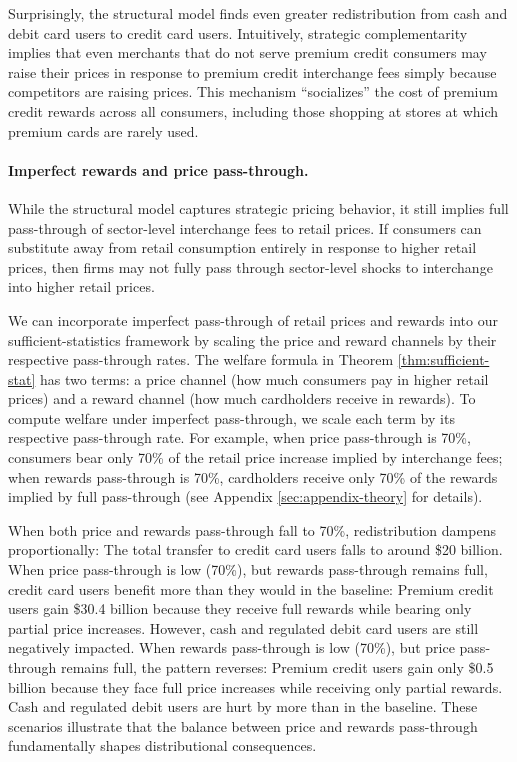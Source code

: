 \documentclass[11pt,english]{article}
\theoremstyle{remark}
\begin{document}
Surprisingly, the structural model finds even greater redistribution from cash and debit card users to credit card users.
Intuitively, strategic complementarity implies that even merchants that do not serve premium credit consumers may raise their prices in response to premium credit interchange fees simply because competitors are raising prices.
This mechanism ``socializes'' the cost of premium credit rewards across all consumers, including those shopping at stores at which premium cards are rarely used.

\paragraph{Imperfect rewards and price pass-through.}
While the structural model captures strategic pricing behavior, it still implies full pass-through of sector-level interchange fees to retail prices.
If consumers can substitute away from retail consumption entirely in response to higher retail prices, then firms may not fully pass through sector-level shocks to interchange into higher retail prices.

We can incorporate imperfect pass-through of retail prices and rewards into our sufficient-statistics framework by scaling the price and reward channels by their respective pass-through rates.
The welfare formula in Theorem \ref{thm:sufficient-stat} has two terms: a price channel (how much consumers pay in higher retail prices) and a reward channel (how much cardholders receive in rewards).
To compute welfare under imperfect pass-through, we scale each term by its respective pass-through rate.
For example, when price pass-through is 70\%, consumers bear only 70\% of the retail price increase implied by interchange fees; when rewards pass-through is 70\%, cardholders receive only 70\% of the rewards implied by full pass-through (see Appendix \ref{sec:appendix-theory} for details).

When both price and rewards pass-through fall to 70\%, redistribution dampens proportionally: The total transfer to credit card users falls to around \$20 billion.
When price pass-through is low (70\%), but rewards pass-through remains full, credit card users benefit more than they would in the baseline: Premium credit users gain \$30.4 billion because they receive full rewards while bearing only partial price increases. 
However, cash and regulated debit card users are still negatively impacted.
When rewards pass-through is low (70\%), but price pass-through remains full, the pattern reverses: Premium credit users gain only \$0.5 billion because they face full price increases while receiving only partial rewards.
Cash and regulated debit users are hurt by more than in the baseline.
These scenarios illustrate that the balance between price and rewards pass-through fundamentally shapes distributional consequences.
\end{document}
